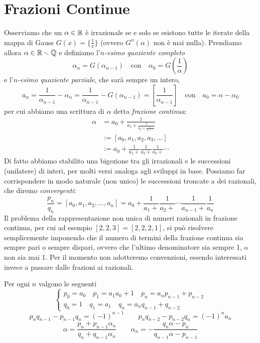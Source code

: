 \section{Frazioni Continue}

Osserviamo che un $\alpha\in\mathbb{R}$ è irrazionale se e solo se esistono tutte le iterate della mappa di Gauss $G(x)=\{\frac{1}{x}\}$ (ovvero $G^n(\alpha)$ non è mai nulla). Prendiamo allora $\alpha\in\mathbb{R}\smallsetminus\mathbb{Q}$ e definiamo l'$n$\emph{-esimo quoziente completo}
\[\alpha_n=G(\alpha_{n-1}) \quad\mbox{con}\quad \alpha_0=G\left(\frac{1}{\alpha}\right)\]
e l'$n$\emph{-esimo quoziente parziale}, che sarà sempre un intero,
\[a_n=\frac{1}{\alpha_{n-1}}-\alpha_n=\frac{1}{\alpha_{n-1}}-G(\alpha_{n-1})=\left[\frac{1}{\alpha_{n-1}}\right] \quad \mbox{con} \quad a_0=\alpha-\alpha_0\]
per cui abbiamo una scrittura di $\alpha$ detta \emph{frazione continua}:
\[\begin{split}
\alpha&=a_0+\frac{1}{a_1+\frac{1}{a_2+\frac{1}{a_3+\dots}}}\\
      &:=[a_0,a_1,a_2,a_3,\dots]\\
      &:=a_0+\frac{1}{a_1+}\frac{1}{a_2+}\frac{1}{a_3+}\cdots
\end{split}\]
Di fatto abbiamo stabilito una bigezione tra gli irrazionali e le successioni (unilatere) di interi, per molti versi analoga agli sviluppi in base. Possiamo far corrispondere in modo naturale (non unico) le successioni troncate a dei razionali, che diremo \emph{convergenti}:
\[\frac{p_n}{q_n}=[a_0,a_1,a_2,\dots,a_n]=a_0+\frac{1}{a_1+}\frac{1}{a_2+}\cdots\frac{1}{a_{n-1}+}\frac{1}{a_n}\]
Il problema della rappresentazione non unica di numeri razionali in frazione continua, per cui ad esempio $[2,2,3]=[2,2,2,1]$, si può risolvere semplicemente imponendo che il numero di termini della frazione continua sia sempre pari o sempre dispari, ovvero che l'ultimo denominatore sia sempre 1, o non sia mai 1. Per il momento non adotteremo convenzioni, essendo interessati invece a passare dalle frazioni ai razionali.

\begin{teo} Per ogni $n$ valgono le seguenti
\[\begin{cases}
   p_0=a_0 \quad p_1=a_1a_0+1 \quad p_{n}=a_np_{n-1}+p_{n-2}\\
   q_0=1 \quad q_1=a_1 \quad q_{n}=a_nq_{n-1}+q_{n-2}
  \end{cases}\]
\[p_nq_{n-1}-p_{n-1}q_n=(-1)^{n-1} \qquad p_nq_{n-2}-p_{n-2}q_n=(-1)^na_n\]
\[\alpha=\frac{p_n+p_{n-1}\alpha_n}{q_n+q_{n-1}\alpha_n} \qquad \alpha_n=-\frac{q_n\alpha-p_n}{q_{n-1}\alpha-p_{n-1}}\]
\end{teo}

